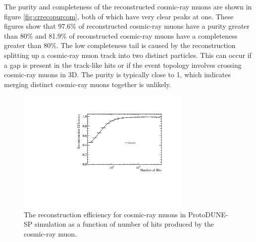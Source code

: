 The purity and completeness of the reconstructed cosmic-ray muons are shown in figure \ref{fig:crrecopurcom}, both of which have very clear peaks at one.  These figures show that 97.6\% of reconstructed cosmic-ray muons have a purity greater than 80\% and 81.9\% of reconstructed cosmic-ray muons have a completeness greater than 80\%.  The low completeness tail is caused by the reconstruction splitting up a cosmic-ray muon track into two distinct particles.  This can occur if a gap is present in the track-like hits or if the event topology involves crossing cosmic-ray muons in 3D.  The purity is typically close to 1, which indicates merging distinct cosmic-ray muons together is unlikely. 

\begin{figure}
\centering
\includegraphics[width=0.75\textwidth]{Figures/Metrics/MC/Cosmics/CosmicRayEfficiencyVsNHits.pdf}
\caption{The reconstruction efficiency for cosmic-ray muons in ProtoDUNE-SP simulation as a function of number of hits produced by the cosmic-ray muon.}
\label{fig:crrecoeff}
\end{figure}


